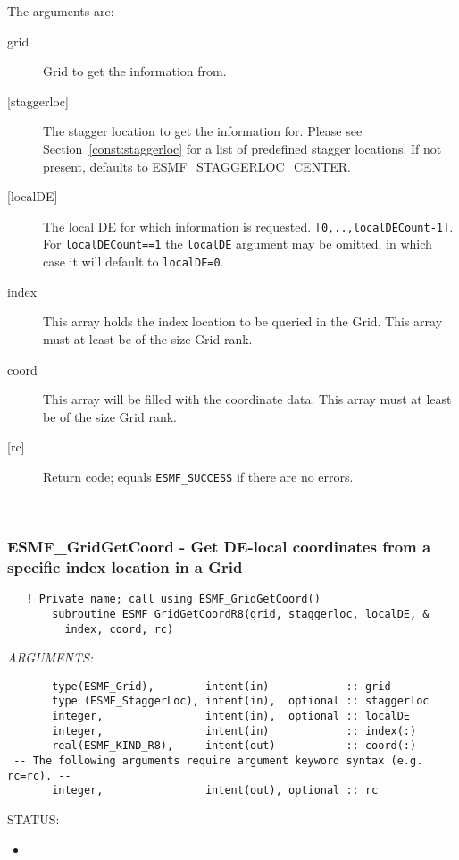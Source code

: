        The arguments are:
       \begin{description}
       \item[grid]
            Grid to get the information from.
       \item[{[staggerloc]}]
            The stagger location to get the information for.
            Please see Section~\ref{const:staggerloc} for a list
            of predefined stagger locations. If not present, defaults to
            ESMF\_STAGGERLOC\_CENTER.
       \item[{[localDE]}]
            The local DE for which information is requested. {\tt [0,..,localDECount-1]}.
            For {\tt localDECount==1} the {\tt localDE} argument may be omitted,
            in which case it will default to {\tt localDE=0}.
       \item[index]
            This array holds the index location to be queried in the Grid. This array must
            at least be of the size Grid rank.
       \item[coord]
            This array will be filled with the coordinate data. This array must
            at least be of the size Grid rank.
       \item[{[rc]}]
            Return code; equals {\tt ESMF\_SUCCESS} if there are no errors.
     \end{description}
   
 
\mbox{}\hrulefill\ 
 

  \label{API:GridGetCoordR8}\subsubsection [ESMF\_GridGetCoord] {ESMF\_GridGetCoord - Get DE-local coordinates from a specific index location in a Grid}


 
\begin{verbatim}   ! Private name; call using ESMF_GridGetCoord()
       subroutine ESMF_GridGetCoordR8(grid, staggerloc, localDE, &
         index, coord, rc)\end{verbatim}{\em ARGUMENTS:}
\begin{verbatim}       type(ESMF_Grid),        intent(in)            :: grid
       type (ESMF_StaggerLoc), intent(in),  optional :: staggerloc
       integer,                intent(in),  optional :: localDE
       integer,                intent(in)            :: index(:)
       real(ESMF_KIND_R8),     intent(out)           :: coord(:)
 -- The following arguments require argument keyword syntax (e.g. rc=rc). --
       integer,                intent(out), optional :: rc\end{verbatim}
{\sf STATUS:}
   \begin{itemize}
   \item{}
   \end{itemize}
  
